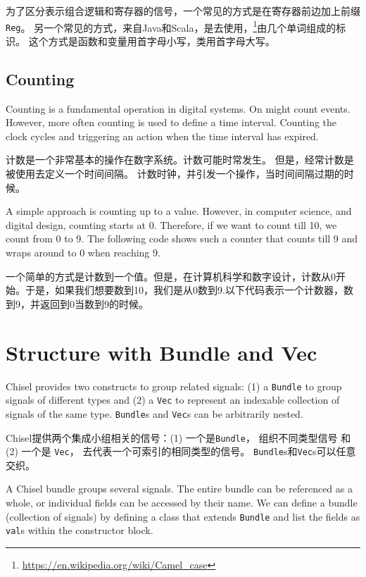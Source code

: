 \documentclass[%
    10pt,
    headinclude, footexclude,
    openright, %
    notitlepage,
    cleardoubleempty,
    headsepline,
    pointlessnumbers,
    bibtotoc, idxtotoc,
    ]{scrbook}
\newcommand{\code}[1]{{\small{\texttt{#1}}}}
\newcommand{\myref}[2]{\href{#1}{#2}}
\renewcommand{\myref}[2]{{#2}{\footnote{\url{#1}}}}
\begin{document}
为了区分表示组合逻辑和寄存器的信号，一个常见的方式是在寄存器前边加上前缀\code{Reg}。
另一个常见的方式，来自Java和Scala，是去使用\myref{https://en.wikipedia.org/wiki/Camel_case}，由几个单词组成的标识。
这个方式是函数和变量用首字母小写，类用首字母大写。


\subsection{Counting}

Counting is a fundamental operation in digital systems. On might count events.
However, more often counting is used to define a time interval. Counting the
clock cycles and triggering an action when the time interval has expired.

计数是一个非常基本的操作在数字系统。计数可能时常发生。
但是，经常计数是被使用去定义一个时间间隔。
计数时钟，并引发一个操作，当时间间隔过期的时候。


A simple approach is counting up to a value. However, in computer science,
and digital design, counting starts at 0. Therefore, if we want to count till
10, we count from 0 to 9. The following code shows such a counter that counts
till 9 and wraps around to 0 when reaching 9.

一个简单的方式是计数到一个值。但是，在计算机科学和数字设计，计数从0开始。于是，如果我们想要数到10，我们是从0数到9.以下代码表示一个计数器，数到9，并返回到0当数到9的时候。



\section{Structure with Bundle and Vec}

Chisel provides two constructs to group related signals: (1) a \code{Bundle} to group
signals of different types and (2) a \code{Vec} to represent an indexable collection of signals
of the same type.
\code{Bundle}s and \code{Vec}s can be arbitrarily nested.

Chisel提供两个集成小组相关的信号：(1) 一个是\code{Bundle}， 组织不同类型信号 和 
(2) 一个是 \code{Vec}， 去代表一个可索引的相同类型的信号。
\code{Bundle}s和\code{Vec}s可以任意交织。


A Chisel bundle groups several signals. The entire bundle can be referenced
as a whole, or individual fields can be accessed by their name.
We can define a bundle (collection of signals) by defining a class that
extends \code{Bundle} and list the fields as \code{val}s within the constructor block.
\end{document}
